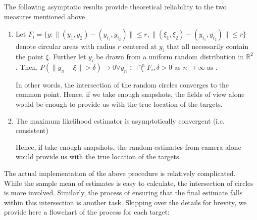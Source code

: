 The following asymptotic results provide theoretical reliability to the two measures mentioned above

\begin{enumerate}
\item Let $F_i=\{y : \| (y_1,y_2) -(y_{i_1},y_{i_2})\| \leq r, \| (\xi_1,\xi_2) -(y_{i_1},y_{i_2})\| \leq r \}$ denote circular areas with radius $r$ centered at $y_i$ that all necessarily contain the point $\xi$. Further let $y_i$ be drawn from a uniform random distribution in $\mathbb{R}^2$. Then, $P(\| y_n - \xi \| > \delta) \rightarrow 0 \forall y_n \in \cap_i^n F_i, \delta>0 $ as $n \rightarrow \infty$  as . 

In other words, the intersection of the random circles converges to the common point. Hence, if we take enough snapshots, the fields of view alone would be enough to provide us with the true location of the targets.

\item The maximum likelihood estimator is asymptotically convergent (i.e. consistent)

Hence, if take enough snapshots, the random estimates from camera alone would provide us with the true location of the targets.
\end{enumerate}

The actual implementation of the above procedure is relatively complicated. While the sample mean of estimates is easy to calculate, the intersection of circles is more involved. Similarly, the process of ensuring that the final estimate falls within this intersection is another task. Skipping over the details for brevity, we provide here a flowchart of the process for each target:

